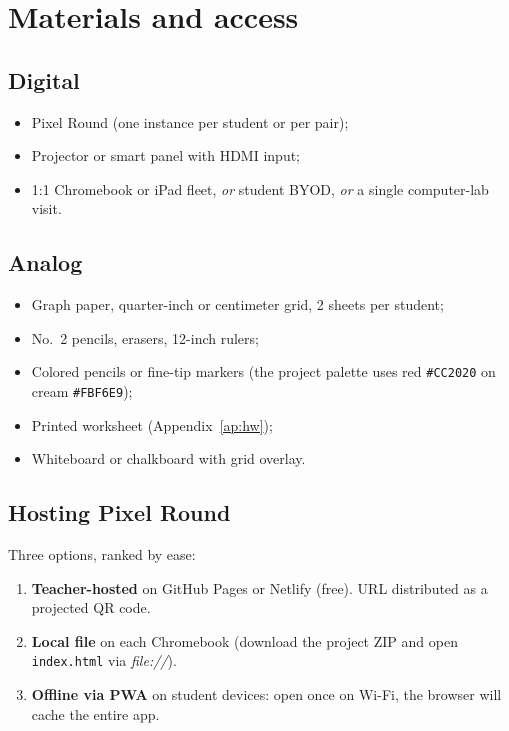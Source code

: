 \documentclass[12pt,letterpaper]{scrartcl}
\begin{document}
\section{Materials and access}

\subsection{Digital}
\begin{itemize}[leftmargin=1.3em,itemsep=0.15em,topsep=0.3em]
  \item Pixel Round (one instance per student or per pair);
  \item Projector or smart panel with HDMI input;
  \item 1:1 Chromebook or iPad fleet, \emph{or} student BYOD, \emph{or} a single computer-lab visit.
\end{itemize}

\subsection{Analog}
\begin{itemize}[leftmargin=1.3em,itemsep=0.15em,topsep=0.3em]
  \item Graph paper, quarter-inch or centimeter grid, 2 sheets per student;
  \item No.~2 pencils, erasers, 12-inch rulers;
  \item Colored pencils or fine-tip markers (the project palette uses red \texttt{\#CC2020} on cream \texttt{\#FBF6E9});
  \item Printed worksheet (Appendix~\ref{ap:hw});
  \item Whiteboard or chalkboard with grid overlay.
\end{itemize}

\subsection{Hosting Pixel Round}
Three options, ranked by ease:

\begin{enumerate}[leftmargin=1.5em,itemsep=0.15em,topsep=0.3em]
  \item \textbf{Teacher-hosted} on GitHub Pages or Netlify (free). URL distributed as a projected QR code.
  \item \textbf{Local file} on each Chromebook (download the project ZIP and open \texttt{index.html} via \emph{file://}).
  \item \textbf{Offline via PWA} on student devices: open once on Wi-Fi, the browser will cache the entire app.
\end{enumerate}
\end{document}
